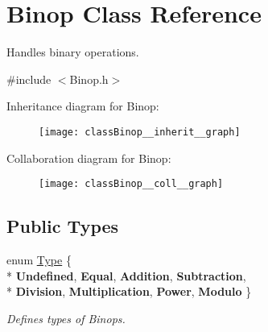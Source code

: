 \hypertarget{classBinop}{}\section{Binop Class Reference}
\label{classBinop}


Handles binary operations.  




{\ttfamily \#include $<$Binop.\+h$>$}



Inheritance diagram for Binop\+:\nopagebreak
\begin{figure}[H]
\begin{center}
\leavevmode
\texttt{[image: classBinop\_\_inherit\_\_graph]}
\end{center}
\end{figure}


Collaboration diagram for Binop\+:\nopagebreak
\begin{figure}[H]
\begin{center}
\leavevmode
\texttt{[image: classBinop\_\_coll\_\_graph]}
\end{center}
\end{figure}
\subsection*{Public Types}
\begin{DoxyCompactItemize}
\item 
\hypertarget{classBinop_a833e85c431d85ca69758bfebec9193dc}{}enum \hyperlink{classBinop_a833e85c431d85ca69758bfebec9193dc}{Type} \{ \\*
{\bfseries Undefined}, 
{\bfseries Equal}, 
{\bfseries Addition}, 
{\bfseries Subtraction}, 
\\*
{\bfseries Division}, 
{\bfseries Multiplication}, 
{\bfseries Power}, 
{\bfseries Modulo}
 \}\label{classBinop_a833e85c431d85ca69758bfebec9193dc}

\begin{DoxyCompactList}\small\item\em Defines types of Binops. \end{DoxyCompactList}\end{DoxyCompactItemize}
